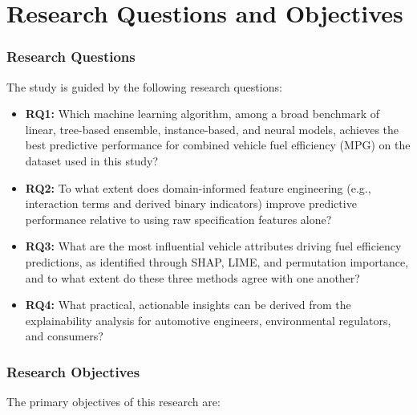\section{Research Questions and Objectives}

\subsubsection{Research Questions}

The study is guided by the following research questions:

\begin{itemize}
    \item \textbf{RQ1:} Which machine learning algorithm, among a broad benchmark of linear, tree-based ensemble, instance-based, and neural models, achieves the best predictive performance for combined vehicle fuel efficiency (MPG) on the dataset used in this study?

    \item \textbf{RQ2:} To what extent does domain-informed feature engineering (e.g., interaction terms and derived binary indicators) improve predictive performance relative to using raw specification features alone?

    \item \textbf{RQ3:} What are the most influential vehicle attributes driving fuel efficiency predictions, as identified through SHAP, LIME, and permutation importance, and to what extent do these three methods agree with one another?

    \item \textbf{RQ4:} What practical, actionable insights can be derived from the explainability analysis for automotive engineers, environmental regulators, and consumers?
\end{itemize}

\subsubsection{Research Objectives}

The primary objectives of this research are:

